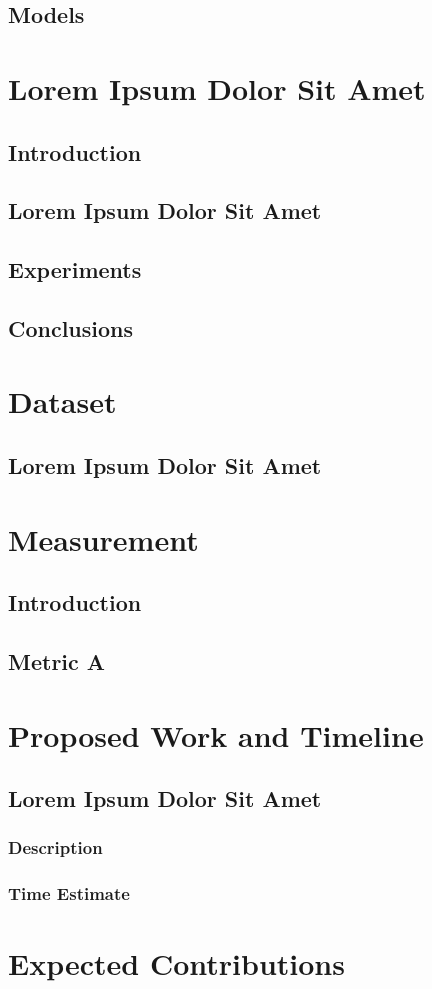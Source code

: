 \documentclass[letterpaper, 12pt, oneside, doublespacing]{Thesis}
\begin{document}
\section{Models}


\chapter{Lorem Ipsum Dolor Sit Amet}
\section{Introduction}

\section{Lorem Ipsum Dolor Sit Amet}

\section{Experiments}

\section{Conclusions}

\chapter{Dataset}

\section{Lorem Ipsum Dolor Sit Amet}

\chapter{Measurement}
\section{Introduction}

\section{Metric A}

\chapter{Proposed Work and Timeline}

\section{Lorem Ipsum Dolor Sit Amet}
\subsection{Description}

\subsection{Time Estimate}

\chapter{Expected Contributions}




\end{document}
